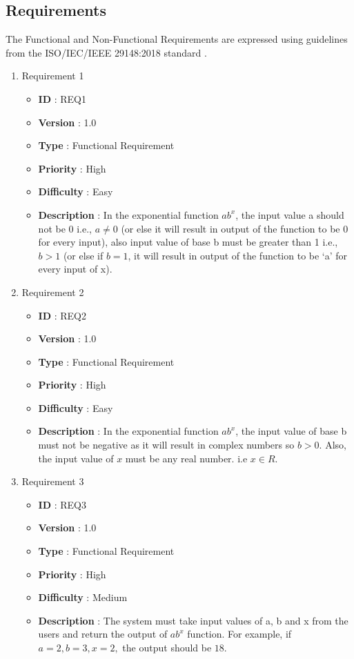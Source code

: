 \documentclass[12pt, a4paper]{article}
\begin{document}
\subsection{Requirements}
The Functional and Non-Functional Requirements are expressed using guidelines from the ISO/IEC/IEEE 29148:2018 standard \cite{Requirements Engineering}.
\begin{enumerate}
	\item{} Requirement 1
	\begin{itemize}
		\item \textbf{ID} : REQ1
		\item \textbf{Version} : 1.0
		\item \textbf{Type} : Functional Requirement
		\item \textbf{Priority} : High
		\item \textbf{Difficulty} : Easy
		\item \textbf{Description} : In the exponential function $ ab^x $, the input value a should not be 0 i.e., $ a \neq 0 $ (or else it will result in output of the function to be 0 for every input), also input value of base b must be greater than 1 i.e., $ b > 1 $ (or else if $b = 1 $, it will result in output of the function to be ‘a’ for every input of x).
	\end{itemize}
	    
	\item{} Requirement 2
	\begin{itemize}
		\item \textbf{ID} : REQ2
		\item \textbf{Version} : 1.0
		\item \textbf{Type} : Functional Requirement
		\item \textbf{Priority} : High
		\item \textbf{Difficulty} : Easy
		\item \textbf{Description} : In the exponential function $ab^x$, the input value of base b must not be negative as it will result in complex numbers so $b > 0$. Also, the input value of $x$ must be any real number. i.e $x \in R$.
	\end{itemize}
	    
	    
	\item{} Requirement 3
	\begin{itemize}
		\item \textbf{ID} : REQ3
		\item \textbf{Version} : 1.0
		\item \textbf{Type} : Functional Requirement
		\item \textbf{Priority} : High
		\item \textbf{Difficulty} : Medium
		\item \textbf{Description} : The system must take input values of a, b and x from the users and return the output of $ab^x$ function. For example, if $ a = 2, b = 3 , x = 2,$ the output should be $ 18 $.
	\end{itemize}
	        

\end{enumerate}
\end{document}
